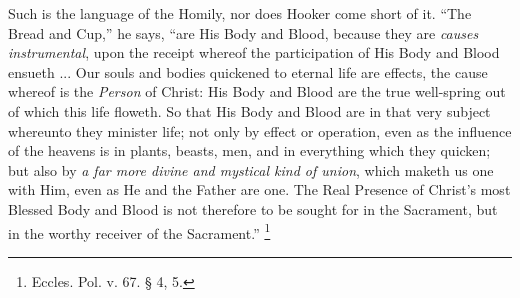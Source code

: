 Such is the language of the Homily, nor does
Hooker come short of it. ``The Bread and Cup,'' he says, ``are His Body
and Blood, because they are \emph{causes instrumental}, upon the
receipt whereof the participation of His Body and Blood ensueth ...
Our souls and bodies quickened to eternal life are effects, the cause
whereof is the \emph{Person} of Christ: His Body and Blood are the
true well-spring out of which this life floweth. So that His Body and
Blood are in that very subject whereunto they minister life; not only
by effect or operation, even as the influence of the heavens is in
plants, beasts, men, and in everything which they quicken; but also by
\emph{a far more divine and mystical kind of union}, which maketh us
one with Him, even as He and the Father are one. The Real Presence of
Christ's most Blessed Body and Blood is not therefore to be sought for
in the Sacrament, but in the worthy receiver of the Sacrament.'' \footnote{Eccles. Pol. v. 67. § 4, 5.}

